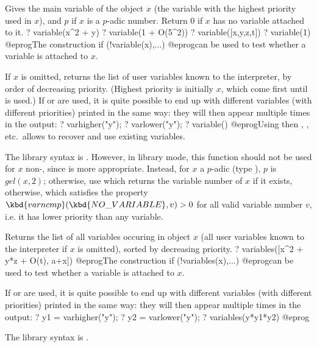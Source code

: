 \label{se:variable}
Gives the main variable of the object $x$ (the variable with the highest
priority used in $x$), and $p$ if $x$ is a $p$-adic number. Return $0$ if
$x$ has no variable attached to it.
\bprog
? variable(x^2 + y)
? variable(1 + O(5^2))
? variable([x,y,z,t])
? variable(1)
@eprog\noindent The construction
\bprog
   if (!variable(x),...)
@eprog\noindent can be used to test whether a variable is attached to $x$.

If $x$ is omitted, returns the list of user variables known to the
interpreter, by order of decreasing priority. (Highest priority is initially
$x$, which come first until  is used.) If 
or  are used, it is quite possible to end up with different
variables (with different priorities) printed in the same way: they
will then appear multiple times in the output:
\bprog
? varhigher("y");
? varlower("y");
? variable()
@eprog\noindent Using  then , ,
etc.~allows to recover and use existing variables.

The library syntax is .
However, in library mode, this function should not be used for $x$
non-, since  is more appropriate. Instead, for
$x$ a $p$-adic (type ), $p$ is $gel(x,2)$; otherwise, use
 which returns the variable number of $x$ if
it exists,  otherwise, which satisfies the property
$\kbd{varncmp}(\kbd{NO\_VARIABLE}, v) > 0$ for all valid variable number
$v$, i.e. it has lower priority than any variable.

\label{se:variables}
Returns the list of all variables occuring in object $x$ (all user
variables known to the interpreter if $x$ is omitted), sorted by
decreasing priority.
\bprog
? variables([x^2 + y*z + O(t), a+x])
@eprog\noindent The construction
\bprog
   if (!variables(x),...)
@eprog\noindent can be used to test whether a variable is attached to $x$.

If  or  are used, it is quite possible to end up
with different variables (with different priorities) printed in the same
way: they will then appear multiple times in the output:
\bprog
? y1 = varhigher("y");
? y2 = varlower("y");
? variables(y*y1*y2)
@eprog

The library syntax is .

